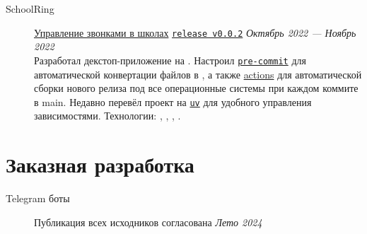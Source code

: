 \documentclass[margin,line]{resume}
\begin{document}
\begin{resume}
\begin{description}
      \vspace{3mm}

    \item[SchoolRing]\small{\href{https://github.com/alchemmist/school-ring}{Управление
        звонками в школах}
        \begingroup
        \hypersetup{urlcolor=blue!30}
        \href{https://github.com/}{\texttt{release v0.0.2}}
        \endgroup
        \hfill
      \textsl{Октябрь 2022 — Ноябрь 2022\vspace{1mm}}}\\
      Разработал декстоп-приложение на . Настроил
      \href{https://github.com}{\texttt{pre-commit}} для
      автоматической конвертации  файлов в
      , а также \href{https://github.com}{actions}
      для автоматической сборки нового релиза под все
      операционные системы при каждом коммите в main. Недавно перевёл
      проект на \href{https://astral.sh/blog/uv}{\texttt{uv}} для
      удобного управления зависимостями.
      Технологии:
      , ,
      , .

  \end{description}

  \section{\mysidestyle Заказная разработка}\vspace{2mm}

  \begin{description}
    \item[Telegram боты]\small{
        \begingroup
        \textcolor{gray!40}{Публикация всех исходников согласована}
        \endgroup
      }{\hfill
      \textsl{Лето 2024}}\vspace{2mm}
\end{description}
\end{resume}
\end{document}
